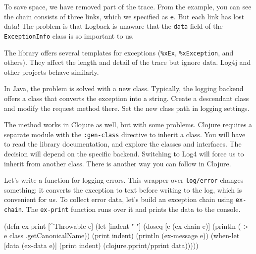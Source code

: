 \fi

To save space, we have removed part of the trace. From the example, you can see the chain consists of three links, which we specified as \verb|e|. But each link has lost data! The problem is that Logback is unaware that the \verb|data| field of the \verb|ExceptionInfo| class is so important to us.


The library offers several templates for exceptions (\verb|%xEx|, \verb|%xException|, and others). They affect the length and detail of the trace but ignore data. Log4j and other projects behave similarly.

In Java, the problem is solved with a new class. Typically, the logging backend offers a class that converts the exception into a string. Create a descendant class and modify the request method there. Set the new class path in logging settings.

The method works in Clojure as well, but with some problems. Clojure requires a separate module with the \verb|:gen-class| directive to inherit a class. You will have to read the library documentation, and explore the classes and interfaces. The decision will depend on the specific backend. Switching to Log4 will force us to inherit from another class. There is another way you can follow in Clojure.

Let's write a function for logging errors. This wrapper over \verb|log/error| changes something: it converts the exception to text before writing to the log, which is convenient for us. To collect error data, let's build an exception chain using \verb|ex-chain|. The \verb|ex-print| function runs over it and prints the data to the console.


\ifx\DEVICETYPE\MOBILE

\begin{english}
  \begin{clojure}
(defn ex-print
  [^Throwable e]
  (let [indent "  "]
    (doseq [e (ex-chain e)]
      (println (-> e
                   class
                   .getCanonicalName))
      (print indent)
      (println (ex-message e))
      (when-let [data (ex-data e)]
        (print indent)
        (clojure.pprint/pprint data)))))
  \end{clojure}
\end{english}

\else

